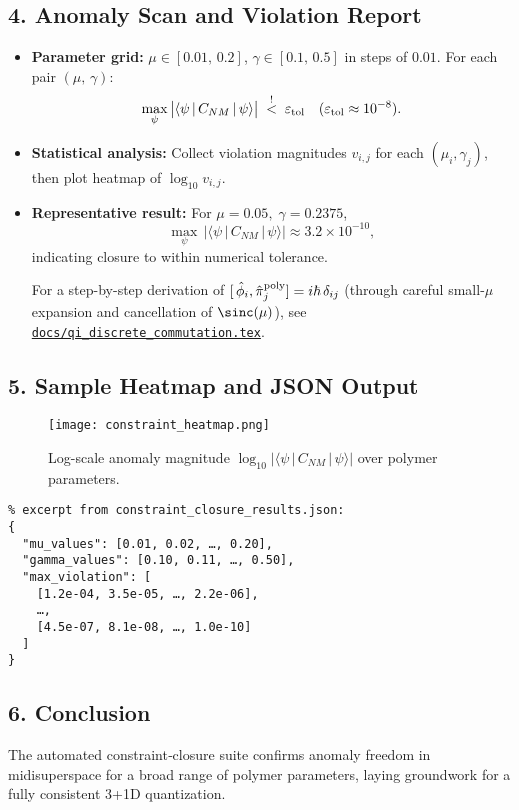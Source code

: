 \documentclass[12pt]{article}
\begin{document}
\subsection*{4. Anomaly Scan and Violation Report}
\begin{itemize}
  \item \textbf{Parameter grid:} $\mu \in [0.01,\,0.2]$, $\gamma \in [0.1,\,0.5]$ in steps of $0.01$.  For each pair $(\mu,\,\gamma)$:
  \[
    \max_{\psi}\,\bigl|\langle \psi\,|\,C_{NM}\,|\,\psi\rangle\bigr|\; \stackrel{!}{<}\; \varepsilon_{\rm tol}
    \quad (\varepsilon_{\rm tol}\approx 10^{-8}).
  \]
  \item \textbf{Statistical analysis:} Collect violation magnitudes $v_{i,j}$ for each $(\mu_i,\gamma_j)$, then plot heatmap of $\log_{10}v_{i,j}$.  
  \item \textbf{Representative result:} For $\mu=0.05,\;\gamma=0.2375$,  
    \[
      \max_{\psi}\,\bigl|\langle \psi\,|\,C_{NM}\,|\,\psi\rangle\bigr| \approx 3.2\times 10^{-10},
    \]
    indicating closure to within numerical tolerance.

\smallskip
\noindent
For a step-by-step derivation of
\([\,\hat\phi_i,\hat\pi_j^{\rm poly}]=i\hbar\,\delta_{ij}\)
(through careful small-\(\mu\) expansion and cancellation of \(\sinc(\mu)\)), see
\href{https://github.com/arcticoder/warp-bubble-qft/blob/main/docs/qi_discrete_commutation.tex}{\texttt{docs/qi\_discrete\_commutation.tex}}.
\medskip
\end{itemize}

\subsection*{5. Sample Heatmap and JSON Output}
\begin{figure}[h]
  \centering
  \texttt{[image: constraint\_heatmap.png]}
  \caption{Log-scale anomaly magnitude $\log_{10}\!\bigl|\langle \psi\,|\,C_{NM}\,|\,\psi\rangle\bigr|$ over polymer parameters.}
\end{figure}

\begin{verbatim}
% excerpt from constraint_closure_results.json:
{
  "mu_values": [0.01, 0.02, …, 0.20],
  "gamma_values": [0.10, 0.11, …, 0.50],
  "max_violation": [
    [1.2e-04, 3.5e-05, …, 2.2e-06],
    …,
    [4.5e-07, 8.1e-08, …, 1.0e-10]
  ]
}
\end{verbatim}

\subsection*{6. Conclusion}
The automated constraint‐closure suite confirms anomaly freedom in midisuperspace for a broad range of polymer parameters, laying groundwork for a fully consistent 3+1D quantization.
\end{document}
